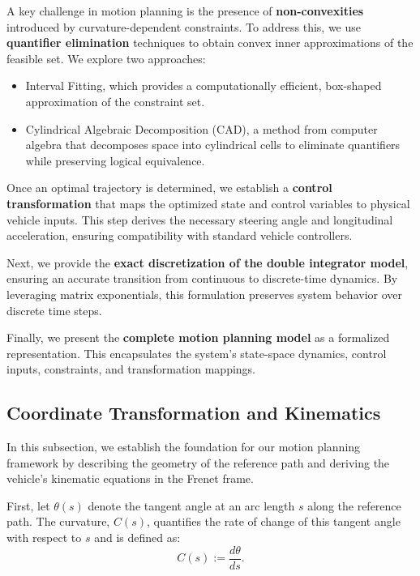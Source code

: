 A key challenge in motion planning is the presence of \textbf{non-convexities} introduced by curvature-dependent constraints.
To address this, we use \textbf{quantifier elimination} techniques to obtain convex inner approximations of the feasible set.
We explore two approaches:
\begin{itemize}
	\item Interval Fitting, which provides a computationally efficient, box-shaped approximation of the constraint set.
	\item Cylindrical Algebraic Decomposition (CAD), a method from computer algebra that decomposes space into cylindrical cells to eliminate quantifiers while preserving logical equivalence.
\end{itemize}

Once an optimal trajectory is determined, we establish a \textbf{control transformation} that maps the optimized state and control variables to
physical vehicle inputs.
This step derives the necessary steering angle and longitudinal acceleration, ensuring compatibility with standard vehicle controllers.

Next, we provide the \textbf{exact discretization of the double integrator model}, ensuring an accurate transition from continuous to discrete-time
dynamics.
By leveraging matrix exponentials, this formulation preserves system behavior over discrete time steps.

Finally, we present the \textbf{complete motion planning model} as a formalized representation.
This encapsulates the system's state-space dynamics, control inputs, constraints, and transformation mappings.

\subsection{Coordinate Transformation and Kinematics}

In this subsection, we establish the foundation for our motion planning framework by describing the geometry of the reference path and deriving the
vehicle's kinematic equations in the Frenet frame.

First, let \(\theta(s)\) denote the tangent angle at an arc length \(s\) along the reference path.
The curvature, \(C(s)\), quantifies the rate of change of this tangent angle with respect to \(s\) and is defined as:
\begin{equation}
	C(s) := \frac{d\theta}{ds}.
\end{equation}

